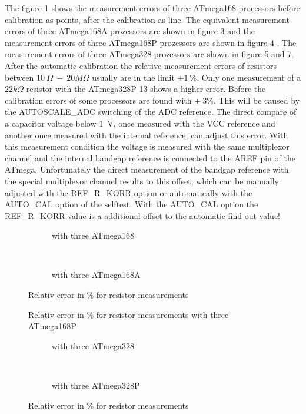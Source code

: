 The figure \ref{fig:m168res_all} shows the measurement errors of three ATmega168 processors before calibration as points, after the
calibration as line. The equivalent measurement errors of three ATmega168A prozessors are shown in figure \ref{fig:m168ares_all} and
the measurement errors of three ATmega168P prozessors are shown in figure \ref{fig:m168pres_all} .
The measurement errors of three ATmega328 prozessors are shown in figure \ref{fig:m328res_all} and \ref{fig:m328pres_all}.
After the automatic calibration the relative measurement errors of resistors between \(10~\Omega~-~20 M\Omega\) 
usually are in the limit \(\pm1~\%\). Only one measurement of a \(22 k\Omega\) resistor with the ATmega328P-13 shows 
a higher error.
Before the calibration errors of some processors are found with \(\pm~3\%\).
This will be caused by the AUTOSCALE\_ADC switching of the ADC reference.
The direct compare of a capacitor voltage below 1~V, once measured with the VCC reference and another once measured with 
the internal reference, can adjust this error.
With this measurement condition the voltage is measured with the same multiplexor channel and the internal bandgap reference
is connected to the AREF pin of the ATmega.
Unfortunately the direct measurement of the bandgap reference with the special multiplexor channel results to this offset,
which can be manually adjusted with the REF\_R\_KORR option or automatically with the AUTO\_CAL option of the selftest.
With the AUTO\_CAL option the REF\_R\_KORR value is a additional offset to the automatic find out value!

\begin{figure}[H]
  \begin{subfigure}[b]{9cm}
    \centering
    \resizebox{9cm}{!}{}
    \caption{with three ATmega168}
    \label{fig:m168res_all}
  \end{subfigure}
  ~
  \begin{subfigure}[b]{9cm}
    \centering
    \resizebox{9cm}{!}{}
    \caption{with three ATmega168A}
    \label{fig:m168ares_all}
  \end{subfigure}
\caption{Relativ error in \% for resistor measurements}
\end{figure}

\begin{figure}[H]
\centering

\caption{Relativ error in \% for resistor measurements with three ATmega168P }
\label{fig:m168pres_all}
\end{figure}

\begin{figure}[H]
  \begin{subfigure}[b]{9cm}
    \centering
    \resizebox{9cm}{!}{}
    \caption{with three ATmega328}
    \label{fig:m328res_all}
  \end{subfigure}
  ~
  \begin{subfigure}[b]{9cm}
    \centering
    \resizebox{9cm}{!}{}
    \caption{with three ATmega328P}
    \label{fig:m328pres_all}
  \end{subfigure}
\caption{Relativ error in \% for resistor measurements}
\end{figure}

